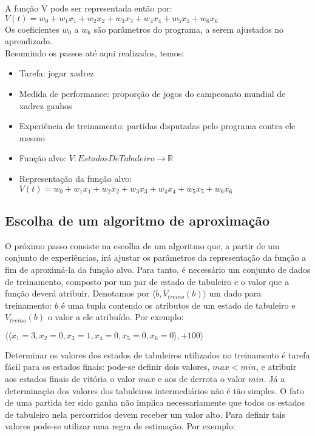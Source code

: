 A função V pode ser representada então por:
\\
$V(t) = w_0 + w_1 x_1 + w_2 x_2 + w_3 x_3 + w_4 x_4 + w_5 x_5 + w_6 x_6$
\\
Os coeficientes $w_0$ a $w_6$ são parâmetros do programa, a serem ajustados no aprendizado.
\\
Resumindo os passos até aqui realizados, temos:

\begin{itemize}
\item Tarefa: jogar xadrez
\item Medida de performance: proporção de jogos do campeonato mundial de xadrez ganhos
\item Experiência de treinamento: partidas disputadas pelo programa contra ele mesmo
\item Função alvo: $V:EstadosDeTabuleiro \rightarrow \mathbb{R}$
\item Representação da função alvo: $V(t) = w_0 + w_1 x_1 + w_2 x_2 + w_3 x_3 + w_4 x_4 + w_5 x_5 + w_6 x_6$
\end{itemize}

\subsection{Escolha de um algoritmo de aproximação}

O próximo passo consiste na escolha de um algoritmo que, a partir de um conjunto de experiências, irá ajustar os parâmetros da representação da função a fim de aproximá-la da função alvo. Para tanto, é necessário um conjunto de dados de treinamento, composto por um par de estado de tabuleiro e o valor que a função deverá atribuir. Denotamos por $\langle b, V_{treino}(b) \rangle $ um dado para treinamento: $b$ é uma tupla contendo os atributos de um estado de tabuleiro e $V_{treino}(b)$ o valor a ele atribuído. Por exemplo:

$\langle \langle x_1 = 3, x_2 = 0, x_3 = 1, x_4 = 0, x_5 = 0, x_6 = 0 \rangle, +100\rangle$

Determinar os valores dos estados de tabuleiros utilizados no treinamento é tarefa fácil para os estados finais: pode-se definir dois valores, $max < min$, e atribuir aos estados finais de vitória o valor $max$ e aos de derrota o valor $min$. Já a determinação dos valores dos tabuleiros intermediários não é tão simples. O fato de uma partida ter sido ganha não implica necessariamente que todos os estados de tabuleiro nela percorridos devem receber um valor alto. Para definir tais valores pode-se utilizar uma regra de estimação. Por exemplo:


